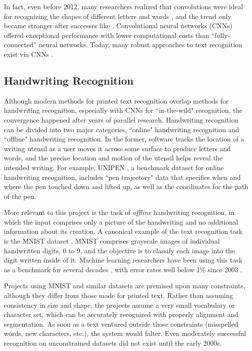 \documentclass[final]{ukthesis}
\begin{document}
In fact, even before 2012, many researchers realized that convolutions were ideal for recognizing the shapes of different letters and words \cite{saidane2007automatic,delakis2008text}, and the trend only became stronger after successes like \cite{wang2012end}. Convolutional neural networks (CNNs) offered exceptional performance with lower computational costs than ``fully-connected'' neural networks. Today, many robust approaches to text recognition exist via CNNs \cite{wang2012end,yin2014robust,jaderberg2016reading}.


\subsection{Handwriting Recognition}
Although modern methods for printed text recognition overlap methods for handwriting recognition, especially with CNNs for ``in-the-wild" recognition, the convergence happened after years of parallel research. Handwriting recognition can be divided into two major categories, ``online" handwriting recognition and ``offline" handwriting recognition. In the former, software tracks the location of a writing utensil as a user moves it across some surface to produce letters and words, and the precise location and motion of the utensil helps reveal the intended writing. For example, UNIPEN \cite{guyon1994unipen}, a benchmark dataset for online handwriting recognition, includes ``pen trajectory" data that specifies when and where the pen touched down and lifted up, as well as the coordinates for the path of the pen.

More relevant to this project is the task of {\em offline} handwriting recognition, in which the input comprises only a picture of the handwriting and no additional information about its creation. A canonical example of the text recognition task is the MNIST dataset \cite{lecun1998mnist}. MNIST comprises grayscale images of individual handwritten digits, 0 to 9, and the objective is to classify each image into the digit written inside of it. Machine learning researchers have been using this task as a benchmark for several decades \cite{bottou1994comparison}, with error rates well below 1\% since 2003 \cite{kussul2004improved}.

Projects using MNIST and similar datasets are premised upon many constraints, although they differ from those made for printed text. Rather than assuming consistency in size and shape, the projects assume a very small vocabulary or character set, which can be accurately recognized with properly alignment and segmentation. As soon as a text ventured outside those constraints (misspelled words, new characters, etc.), the system would falter. Even moderately successful recognition on unconstrained datasets did not exist until the early 2000s.
\end{document}

